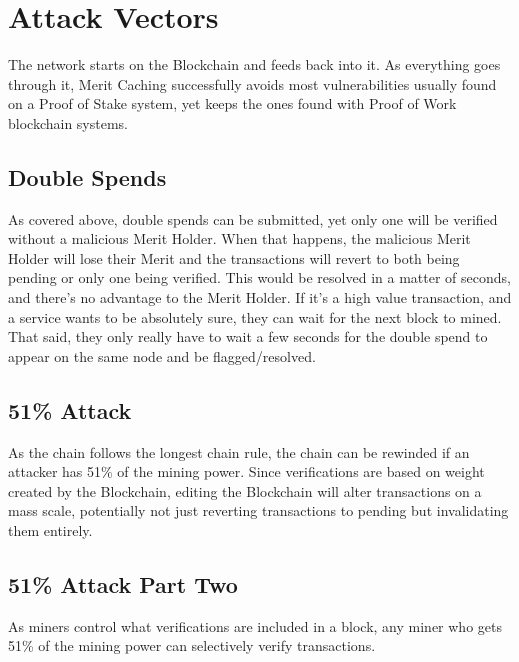 \documentclass[14pt]{article}
\begin{document}
\newpage

\section{Attack Vectors}
The network starts on the Blockchain and feeds back into it. As everything goes through it, Merit Caching successfully avoids most vulnerabilities usually found on a Proof of Stake system, yet keeps the ones found with Proof of Work blockchain systems.

\subsection{Double Spends}
As covered above, double spends can be submitted, yet only one will be verified without a malicious Merit Holder. When that happens, the malicious Merit Holder will lose their Merit and the transactions will revert to both being pending or only one being verified. This would be resolved in a matter of seconds, and there's no advantage to the Merit Holder. If it's a high value transaction, and a service wants to be absolutely sure, they can wait for the next block to mined. That said, they only really have to wait a few seconds for the double spend to appear on the same node and be flagged/resolved.

\subsection{51\% Attack}
As the chain follows the longest chain rule, the chain can be rewinded if an attacker has 51\% of the mining power. Since verifications are based on weight created by the Blockchain, editing the Blockchain will alter transactions on a mass scale, potentially not just reverting transactions to pending but invalidating them entirely.

\subsection{51\% Attack Part Two}
As miners control what verifications are included in a block, any miner who gets 51\% of the mining power can selectively verify transactions.
\end{document}
